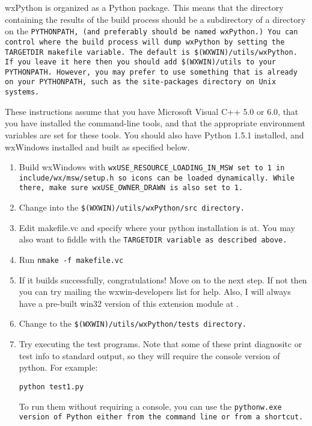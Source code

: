 wxPython is organized as a Python package.  This means that the
directory containing the results of the build process should be a
subdirectory of a directory on the \tt{PYTHONPATH}, (and preferably
should be named wxPython.)  You can control where the build process
will dump wxPython by setting the \tt{TARGETDIR} makefile variable.
The default is \tt{\$(WXWIN)/utils/wxPython}.  If you leave it here
then you should add \tt{\$(WXWIN)/utils} to your \tt{PYTHONPATH}.
However, you may prefer to use something that is already on your 
\tt{PYTHONPATH}, such as the \tt{site-packages} directory on Unix
systems.


These instructions assume that you have Microsoft Visual C++ 5.0 or
6.0, that you have installed the command-line tools, and that the
appropriate environment variables are set for these tools.  You should
also have Python 1.5.1 installed, and wxWindows installed and built as
specified below.

\begin{enumerate}\itemsep=0pt
\item Build wxWindows with \tt{wxUSE_RESOURCE_LOADING_IN_MSW} set to 1 in
\tt{include/wx/msw/setup.h} so icons can be loaded dynamically.  While
there, make sure \tt{wxUSE_OWNER_DRAWN} is also set to 1.
\item Change into the \tt{\$(WXWIN)/utils/wxPython/src} directory.
\item Edit makefile.vc and specify where your python installation is at.
You may also want to fiddle with the \tt{TARGETDIR} variable as described
above.
\item Run \tt{nmake -f makefile.vc}
\item If it builds successfully, congratulations!  Move on to the next
step.  If not then you can try mailing the wxwin-developers list for
help.  Also, I will always have a pre-built win32 version of this extension module at 
.
\item Change to the \tt{\$(WXWIN)/utils/wxPython/tests} directory.
\item Try executing the test programs.  Note that some of these print
diagnositc or test info to standard output, so they will require the
console version of python.  For example:

\tt{python test1.py}

To run them without requiring a console, you can use the \tt{pythonw.exe}
version of Python either from the command line or from a shortcut.
\end{enumerate}

